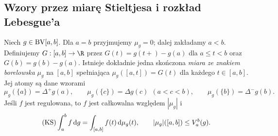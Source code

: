 \subsection*{Wzory przez miarę Stieltjesa i rozkład Lebesgue'a}
\begin{twierdzenie}
\label{tw:ks-measure}
Niech $g\in\mathrm{BV}[a,b]$. Dla $a=b$ przyjmujemy $\mu_g=0$; dalej zakładamy $a<b$. Definiujemy $G:[a,b]\to\R$ przez $G(t)=g(t+)-g(a)$ dla $a\le t<b$ oraz $G(b)=g(b)-g(a)$. Istnieje dokładnie jedna skończona \emph{miara ze znakiem borelowska} $\mu_g$ na $[a,b]$ spełniająca $\mu_g([a,t])=G(t)$ dla każdego $t\in[a,b]$. Jej atomy są dane wzorami
\[
 \mu_g(\{a\})=\Delta^+g(a),\qquad
 \mu_g(\{c\})=\Delta g(c)\ \ (a<c<b),\qquad
 \mu_g(\{b\})=\Delta^-g(b).
\]
Jeśli $f$ jest regulowana, to $f$ jest całkowalna względem $|\mu_g|$ i
\[
 (\mathrm{KS})\int_a^b f\,\mathrm dg=\int_{[a,b]}f(t)\,\mathrm d\mu_g(t),
 \qquad |\mu_g|([a,b])\le V_a^b(g).
\]
\end{twierdzenie}
